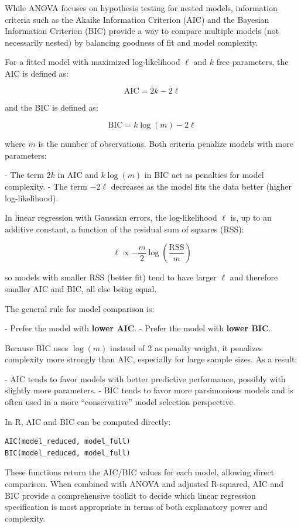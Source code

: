 While ANOVA focuses on hypothesis testing for nested models, information criteria such as the Akaike Information Criterion (AIC) and the Bayesian Information Criterion (BIC) provide a way to compare multiple models (not necessarily nested) by balancing goodness of fit and model complexity.

For a fitted model with maximized log-likelihood $\ell$ and $k$ free parameters, the AIC is defined as:

\[
\text{AIC} = 2k - 2\ell
\]

and the BIC is defined as:

\[
\text{BIC} = k \log(m) - 2\ell
\]

where $m$ is the number of observations. Both criteria penalize models with more parameters:

- The term $2k$ in AIC and $k \log(m)$ in BIC act as penalties for model complexity.
- The term $-2\ell$ decreases as the model fits the data better (higher log-likelihood).

In linear regression with Gaussian errors, the log-likelihood $\ell$ is, up to an additive constant, a function of the residual sum of squares (RSS):

\[
\ell \propto -\frac{m}{2} \log\left(\frac{\text{RSS}}{m}\right)
\]

so models with smaller RSS (better fit) tend to have larger $\ell$ and therefore smaller AIC and BIC, all else being equal.

The general rule for model comparison is:

- Prefer the model with \textbf{lower AIC}.
- Prefer the model with \textbf{lower BIC}.

Because BIC uses $\log(m)$ instead of 2 as penalty weight, it penalizes complexity more strongly than AIC, especially for large sample sizes. As a result:

- AIC tends to favor models with better predictive performance, possibly with slightly more parameters.
- BIC tends to favor more parsimonious models and is often used in a more “conservative” model selection perspective.

In R, AIC and BIC can be computed directly:

\begin{verbatim}
AIC(model_reduced, model_full)
BIC(model_reduced, model_full)
\end{verbatim}

These functions return the AIC/BIC values for each model, allowing direct comparison. When combined with ANOVA and adjusted R-squared, AIC and BIC provide a comprehensive toolkit to decide which linear regression specification is most appropriate in terms of both explanatory power and complexity.


